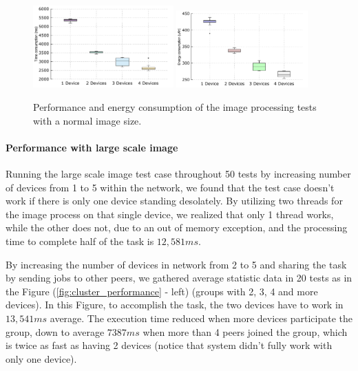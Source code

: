 \documentclass{sig-alternate}
\begin{document}
\begin{figure}
	\centering
		\includegraphics[width=0.48\textwidth]{data/img_small_perf_full.pdf}
		\includegraphics[width=0.45\textwidth]{data/img_small_energy.pdf}
	\caption{Performance and energy consumption of the image processing tests with a normal image size.}
	\label{fig:small_img_perf}
\end{figure}


\paragraph{Performance with large scale image}
Running the large scale image test case throughout 50 tests by increasing number of devices from 1 to 5 within the network, we found that the test case doesn't work if there is only one device standing desolately. By utilizing two threads for the image process on that single device, we realized that only 1 thread works, while the other does not, due to an out of memory exception, and the processing time to complete half of the task is $12,581ms$. 

By increasing the number of devices in network from 2 to 5 and sharing the task by sending jobs to other peers, we gathered average statistic data in 20 tests as in the Figure (\ref{fig:cluster_performance} - left) (groups with 2, 3, 4 and more devices). In this Figure, to accomplish the task, the two devices have to work in $13,541ms$ average. The execution time reduced when more devices participate the group, down to average $7387ms$ when more than 4 peers joined the group, which is twice as fast as having 2 devices (notice that system didn't fully work with only one device).
\end{document}
